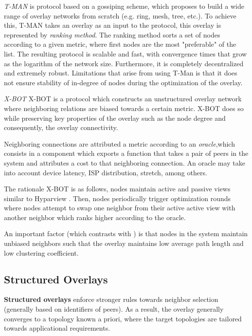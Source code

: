 \textit{T-MAN} \cite{jelasity2005t} is protocol based on a gossiping scheme, which proposes to build a wide range of overlay networks from scratch (e.g. ring, mesh, tree, etc.). To achieve this, T-MAN takes an overlay as an input to the protocol, this overlay is represented by \textit{ranking method}. The ranking method sorts a set of nodes according to a given metric, where first nodes are the most "preferable" of the list. The resulting protocol is scalable and fast, with convergence times that grow as the logarithm of the network size. Furthermore, it is completely decentralized and extremely robust. Limitations that arise from using T-Man is that it does not ensure stability of in-degree of nodes during the optimization of the overlay.

\textit{X-BOT} \cite{leitao2012x} X-BOT is a protocol which constructs an unstructured overlay network where neighboring relations are biased towards a certain metric. X-BOT does so while preserving key properties of the overlay such as the node degree and consequently, the overlay connectivity.

Neighboring connections are attributed a metric according to an \textit{oracle},which consists in a component which exports a function that takes a pair of peers in the system and attributes a cost to that neighboring connection. An oracle may take into account device latency, ISP distribution, stretch, among others. 

The rationale X-BOT is as follows, nodes maintain active and passive views similar to Hyparview \cite{Hyparview}. Then, nodes periodically trigger optimization rounds where nodes attempt to swap one neighbor from their active active view with another neighbor which ranks higher according to the oracle. 

An important factor (which contrasts with \cite{jelasity2005t}) is that nodes in the system maintain unbiased neighbors such that the overlay maintains low average path length and low clustering coefficient.

\subsection{Structured Overlays} 

\textbf{Structured overlays} enforce stronger rules towards neighbor selection (generally based on identifiers of peers). As a result, the overlay generally converges to a topology known a priori, where the target topologies are tailored towards applicational requirements. 

